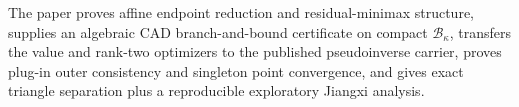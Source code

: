 The paper proves affine endpoint reduction and residual-minimax structure, supplies an algebraic CAD branch-and-bound certificate on compact \(\mathcal B_\kappa\), transfers the value and rank-two optimizers to the published pseudoinverse carrier, proves plug-in outer consistency and singleton point convergence, and gives exact triangle separation plus a reproducible exploratory Jiangxi analysis.